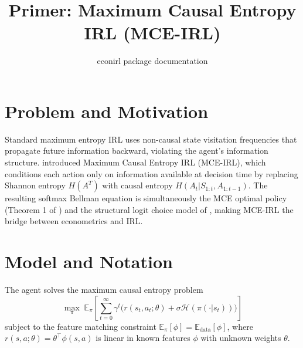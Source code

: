 \documentclass[10pt]{article}
\title{Primer: Maximum Causal Entropy IRL (MCE-IRL)}
\author{econirl package documentation}
\date{}
\newcommand{\E}{\mathbb{E}}
\newcommand{\calH}{\mathcal{H}}
\begin{document}
\maketitle


\section{Problem and Motivation}

Standard maximum entropy IRL \citep{ziebart2008} uses non-causal state visitation frequencies that propagate future information backward, violating the agent's information structure. \citet{ziebart2010} introduced Maximum Causal Entropy IRL (MCE-IRL), which conditions each action only on information available at decision time by replacing Shannon entropy $H(A^T)$ with causal entropy $H(A_t | S_{1:t}, A_{1:t-1})$. The resulting softmax Bellman equation is simultaneously the MCE optimal policy (Theorem 1 of \citealt{ziebart2010}) and the structural logit choice model of \citet{rust1987}, making MCE-IRL the bridge between econometrics and IRL.


\section{Model and Notation}

The agent solves the maximum causal entropy problem
\begin{equation}
\label{eq:mce_objective}
\max_\pi \; \E_\pi\!\left[\sum_{t=0}^{\infty} \gamma^t \bigl(r(s_t, a_t;\theta) + \sigma \calH(\pi(\cdot | s_t))\bigr)\right]
\end{equation}
subject to the feature matching constraint $\E_\pi[\phi] = \E_{\text{data}}[\phi]$, where $r(s,a;\theta) = \theta^\top \phi(s,a)$ is linear in known features $\phi$ with unknown weights $\theta$.
\end{document}
